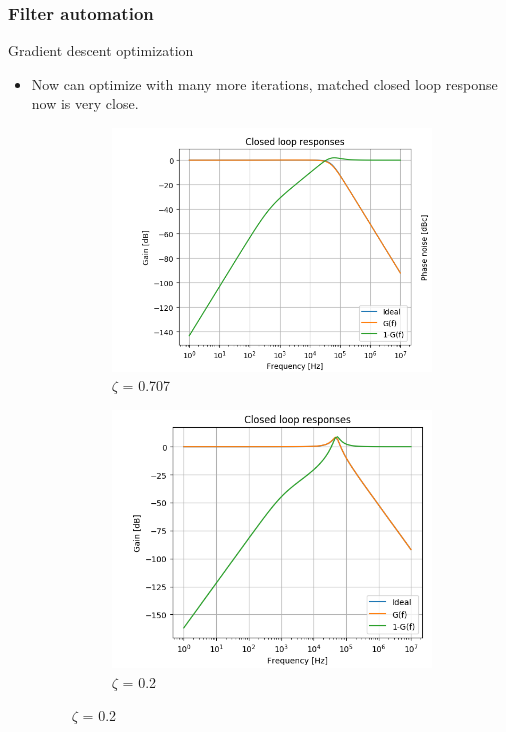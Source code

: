 \documentclass[t, screen, aspectratio=43]{beamer}
\begin{document}
\begin{frame}
	\frametitle{Filter automation}
	\begin{block}{Gradient descent optimization}
		\begin{itemize}
		\footnotesize
		\item Now can optimize with many more iterations, matched closed loop response now is very close.
		\hspace{-20em}\begin{figure}[htb!]
	        \centering
	        \begin{subfigure}{0.4\textwidth}
	            \centering
	            \includegraphics[width=0.9\linewidth]{tf_0707.png}
	            \caption{\scriptsize $\zeta$ = 0.707}
	            \label{fig:rosc_3stg_cir}
	        \end{subfigure}%
	        \begin{subfigure}{0.4\textwidth}
	            \centering
	            \includegraphics[width=0.9\linewidth]{tf_02.png}
	            \caption{\scriptsize $\zeta$ = 0.2}
	            \label{fig:rosc_3stg_wave}
	        \end{subfigure}
	        \label{fig:rosc_3stg}
	    \end{figure}
		\end{itemize}    
	\end{block}
\end{frame}
\end{document}
